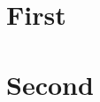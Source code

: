 \documentclass[twopage, openright]{book}
\begin{document}
\lipsum[2]
\newpage
\chapter{First}
\lipsum[3]
\chapter{Second}
\lipsum[3]
\end{document}

